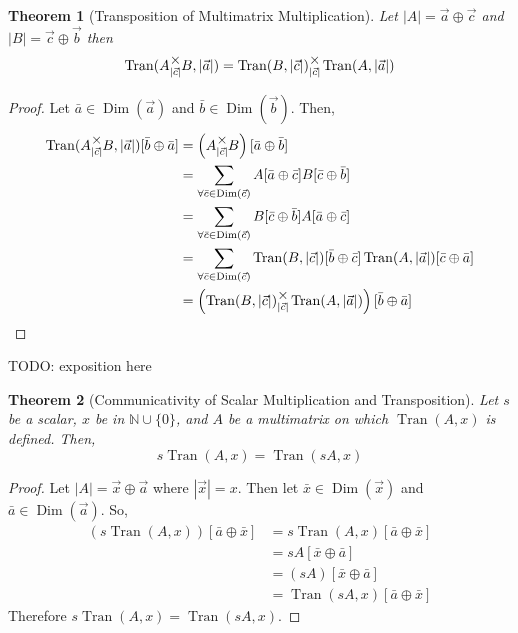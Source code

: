 \documentclass[12pt]{book}
\theoremstyle{plain}
\newtheorem{theorem}{Theorem}[chapter]
\theoremstyle{definition}
\theoremstyle{ppart}
\theoremstyle{case}
\theoremstyle{solution}
\DeclareMathOperator{\Dim}{Dim}
\DeclareMathOperator{\Tran}{Tran}
\newcommand{\mmult}[1]{\text{\raisebox{1ex}{$\underset{#1}{\times}$}}}
\newcommand{\shape}[1]{\left|#1\right|}
\begin{document}
\begin{theorem}[Transposition of Multimatrix Multiplication]
\label{mm_tran_mult}
Let $\shape{A} = \vec{a} \oplus \vec{c}$ and $\shape{B} = \vec{c} \oplus \vec{b}$ then
\[
 \Tran(A \mmult{\shape{\vec{c}}} B, \shape{\vec{a}})
 =  \Tran(B, \shape{\vec{c}}) \mmult{\shape{\vec{c}}} \Tran(A, \shape{\vec{a}})
\]
\end{theorem}
\begin{proof}
Let $\bar{a} \in \Dim(\vec{a})$ and $\bar{b} \in \Dim(\vec{b})$.
Then,
\begin{align*}
	\Tran(A \mmult{\shape{\vec{c}}} B, \shape{\vec{a}})[\bar{b} \oplus \bar{a}]
	&=
	\left(A \mmult{\shape{\vec{c}}} B \right)[\bar{a} \oplus \bar{b}] \\
	&=
	\sum_{\forall \bar{c} \in \Dim(\vec{c})}
	A[\bar{a} \oplus \bar{c}] B[\bar{c} \oplus \bar{b}] \\
	&=
	\sum_{\forall \bar{c} \in \Dim(\vec{c})}
	B[\bar{c} \oplus \bar{b}] A[\bar{a} \oplus \bar{c}] \\
	&=
	\sum_{\forall \bar{c} \in \Dim(\vec{c})}
	\Tran(B, \shape{\vec{c}})[\bar{b} \oplus \bar{c}]
	\Tran(A, \shape{\vec{a}})[\bar{c} \oplus \bar{a}] \\
	&=
	\left(\Tran(B, \shape{\vec{c}}) \mmult{\shape{\vec{c}}} \Tran(A, \shape{\vec{a}}) \right)
	[\bar{b} \oplus \bar{a}]
\end{align*}
\end{proof}

TODO: exposition here

\begin{theorem}[Communicativity of Scalar Multiplication and Transposition]
Let $s$ be a scalar, $x$ be in $\mathbb{N} \cup \{0\}$, and $A$ be
a multimatrix on which $\Tran(A, x)$ is defined. Then,
\[ s\Tran(A, x) = \Tran(sA, x) \]
\end{theorem}
\begin{proof}
Let $\shape{A} = \vec{x} \oplus \vec{a}$ where $\shape{\vec{x}} = x$. Then
let $\bar{x} \in \Dim(\vec{x})$ and $\bar{a} \in \Dim(\vec{a})$. So,
\begin{align*}
  (s\Tran(A, x))[\bar{a} \oplus \bar{x}]
  &= s \Tran(A, x)[\bar{a} \oplus \bar{x}] \\
  &= s A[\bar{x} \oplus \bar{a}] \\
  &= (s A)[\bar{x} \oplus \bar{a}] \\
  &= \Tran(sA, x)[\bar{a} \oplus \bar{x}]
\end{align*}
Therefore $s\Tran(A, x) = \Tran(sA, x)$.
\end{proof}
\end{document}
